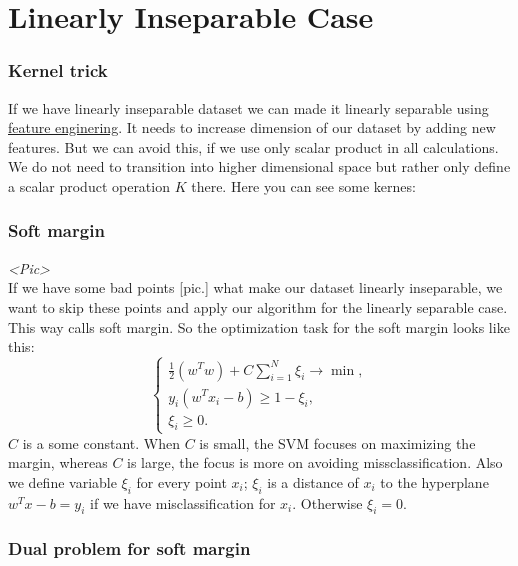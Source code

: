 \section{Linearly Inseparable Case}
\vspace{-0.6cm}
\subsubsection*{Kernel trick}

If we have linearly inseparable dataset we can made it linearly separable using \hyperlink{new_features}{feature enginering}. It needs to increase dimension of our dataset by adding new features. But we can avoid this, if we use only scalar product in all calculations. We do not need to transition into higher dimensional space but rather only
define a scalar product operation $K$ there. Here you can see some kernes:\\
{\it <Pics with examples>}

\subsubsection*{Soft margin}

{\it <Pic>}\\
If we have some bad points [pic.] what make our dataset linearly inseparable, we want to skip these points and apply our algorithm for the linearly separable case. This way calls soft margin. So the optimization task for the soft margin looks like this:
$$\begin{cases}
	\frac{1}{2}(w^Tw)+C\sum\limits_{i=1}^{N}\xi_i\to\min, \\
	y_i(w^Tx_i-b)\ge1-\xi_i, \\
	\xi_i\ge0.
\end{cases}$$
$C$ is a some constant. When $C$ is small, the SVM focuses on maximizing the margin, whereas $C$ is large, the focus is more on avoiding missclassification. Also we define variable $\xi_i$ for every point $x_i$; $\xi_i$ is a distance of $x_i$ to the hyperplane $w^Tx-b=y_i$ if we have misclassification for $x_i$. Otherwise $\xi_i=0$.

\subsubsection*{Dual problem for soft margin}

